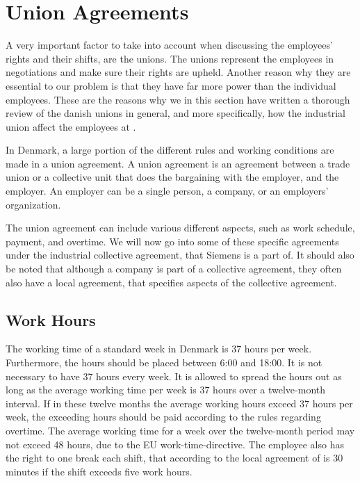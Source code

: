 \section{Union Agreements}

A very important factor to take into account when discussing the employees' rights and their shifts, are the unions. The unions represent the employees in negotiations and make sure their rights are upheld. Another reason why they are essential to our problem is that they have far more power than the individual employees. These are the reasons why we in this section have written a thorough review of the danish unions in general, and more specifically, how the industrial union affect the employees at \siemens.

In Denmark, a large portion of the different rules and working conditions are made in a union agreement. A union agreement is an agreement between a trade union or a collective unit that does the bargaining with the employer, and the employer. An employer can be a single person, a company, or an employers' organization.

The union agreement can include various different aspects, such as work schedule, payment, and overtime. We will now go into some of these specific agreements under the industrial collective agreement, that Siemens is a part of. It should also be noted that although a company is part of a collective agreement, they often also have a local agreement, that specifies aspects of the collective agreement. \parencite{noauthor_collective_nodate}

\subsection{Work Hours}
The working time of a standard week in Denmark is 37 hours per week. Furthermore, the hours should be placed between 6:00 and 18:00.
It is not necessary to have 37 hours every week. It is allowed to spread the hours out as long as the average working time per week is 37 hours over a twelve-month interval. 
If in these twelve months the average working hours exceed 37 hours per week, the exceeding hours should be paid according to the rules regarding overtime. The average working time for a week over the twelve-month period may not exceed 48 hours, due to the EU work-time-directive. The employee also has the right to one break each shift, that according to the local agreement of \siemens is 30 minutes if the shift exceeds five work hours. \parencite{industriens_overenskomst}

